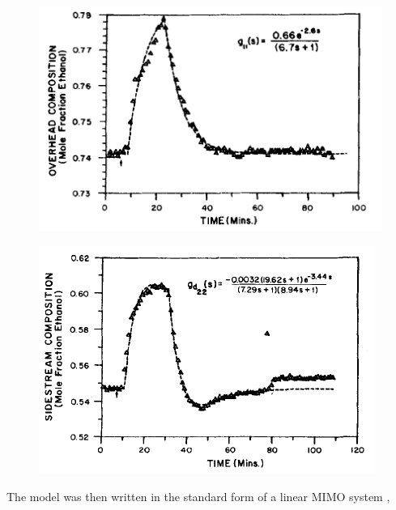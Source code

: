 \begin{figure}[htbp]
	\centering
	\begin{minipage}{.48\textwidth}
		\centering
		\includegraphics[width=\linewidth]{Figures/Pulse_test_1}
		\label{fig:test1}
	\end{minipage}%
	\hfill
	\begin{minipage}{.48\textwidth}
		\centering
		\includegraphics[width=\linewidth]{Figures/Pulse_test_2}
		\label{fig:test2}
	\end{minipage}
\end{figure}

The model was then written in the standard form of a linear MIMO system \parencite{ogun},

